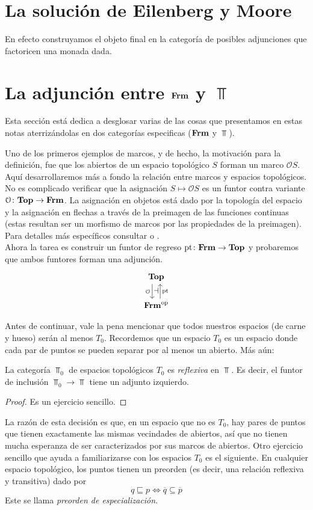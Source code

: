 \documentclass{comunicaciones}
\begin{document}
\section{La solución de Eilenberg y Moore}\label{EMSOL}

En efecto construyamos el objeto final en la categoría de posibles adjunciones que factoricen una monada dada.


\section{La adjunción entre $\mathbf{Frm}$ y $\Top$}

Esta sección está dedica a desglosar varias de las cosas que presentamos en estas notas aterrizándolas en dos categorías especificas ($\mathbf{Frm}$ y $\Top$).

Uno de los primeros ejemplos de marcos, y de hecho, la
motivación para la definición, fue que los abiertos de un espacio
topológico $S$ forman un marco $\mathcal{O}S$.
Aquí desarrollaremos más a fondo la relación entre marcos
y espacios topológicos. No es complicado verificar que la asignación $S\mapsto\mathcal{O}S$ es
un funtor contra variante $\mathcal{O}\colon\mathbf{Top}\to\mathbf{Frm}$. La asignación en objetos está dado por la topología del espacio y la asignación en flechas a través de la preimagen de las funciones continuas (estas resultan ser un morfismo de marcos por las propiedades de la preimagen). Para detalles más específicos consultar \cite{P.T.} o \cite{J.P.}.\\

Ahora la tarea es construir un funtor de regreso $\mathrm{pt}\colon\mathbf{Frm}\to\mathbf{Top}$
y probaremos que ambos funtores forman una adjunción.
\[
  \begin{tikzcd}
    \Top \ar[d,shift right=2,"\Cal O"'{name=L}]
    \\
    \Frm^\op \ar[u,shift right=2,"\pt"'{name=R}]
    \adj{L}{R}
  \end{tikzcd}
\]

Antes de continuar, vale la pena mencionar que todos nuestros espacios
(de carne y hueso) serán al menos $T_{0}$. Recordemos que un espacio
$T_0$ es un espacio donde cada par de puntos se pueden separar por al
menos un abierto. Más aún:
\begin{thm}\label{tcero}
    La categoría $\Top_0$ de espacios topológicos
    $T_0$  es \emph{reflexiva} en $\Top$.
    Es decir, el funtor de inclusión $\Top_0\to\Top$
    tiene un adjunto izquierdo.
\end{thm}
\begin{proof}
Es un ejercicio sencillo.
\end{proof}
La razón de esta decisión es que, en un espacio que no es $T_0$, hay
pares de puntos que tienen exactamente las mismas vecindades de
abiertos, así que no tienen mucha esperanza de ser caracterizados por
sus marcos de abiertos.
Otro ejercicio sencillo que ayuda a familiarizarse con los espacios
$T_0$ es el siguiente. En cualquier espacio topológico, los puntos
tienen un preorden (es decir, una relación reflexiva y transitiva)
dado por
  \[q\sqsubseteq p\iff \overline{q}\subseteq \overline{p}\]
  Este se llama \emph{preorden de especialización}.
\end{document}
